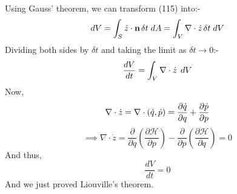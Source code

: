 \documentclass[12pt]{article}
\begin{document}
    \\ Using Gauss' theorem, we can transform (115) into:-
    \begin{equation}
        dV = \int_{S}\dot{z}\cdot\mathbf{n}\hspace{0.05cm}\delta t\hspace{0.1cm}dA=\int_{V}\nabla\cdot\dot{z}\hspace{0.05cm}\delta t\hspace{0.1cm}dV
    \end{equation}
    Dividing both sides by $\delta t$ and taking the limit as $\delta t \rightarrow 0$:-
    \begin{equation}
        \frac{dV}{dt}=\int_{V}\nabla\cdot\dot{z}\hspace{0.05cm}\hspace{0.1cm}dV
    \end{equation}
    Now,
    \begin{equation}
        \nabla \cdot\dot{z}=\nabla\cdot(\dot{q},\dot{p})=\frac{\partial\dot{q}}{\partial{q}}+\frac{\partial\dot{p}}{\partial{p}}\notag
    \end{equation}
    \begin{equation}
        \implies \nabla \cdot\dot{z}=\frac{\partial}{\partial{q}}\left(\frac{\partial \mathcal{H}}{\partial{p}}\right)-\frac{\partial}{\partial{p}}\left(\frac{\partial \mathcal{H}}{\partial{q}}\right)=0
    \end{equation}
    And thus,
    \begin{equation}
        \frac{dV}{dt}=0
    \end{equation}
    And we just proved Liouville's theorem.
    
\end{document}
